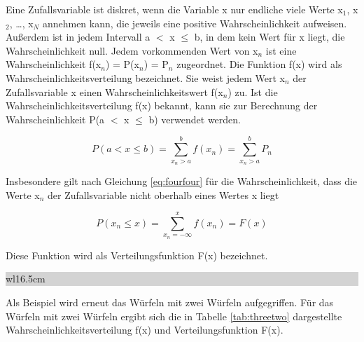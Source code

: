 \noindent Eine Zufallsvariable ist diskret, wenn die Variable x nur endliche viele Werte x$_{1}$, x$_{2}$, {\dots}, x$_{N}$ annehmen kann, die jeweils eine positive Wahrscheinlichkeit aufweisen. Au{\ss}erdem ist in jedem Intervall a $\mathrm{<}$ x $\leq$ b, in dem kein Wert f\"{u}r x liegt, die Wahrscheinlichkeit null. Jedem vorkommenden Wert von x$_{n}$ ist eine Wahrscheinlichkeit f(x$_{n}$) = P(x$_{n}$) = P$_{n}$ zugeordnet. Die Funktion f(x) wird als Wahrscheinlichkeitsverteilung bezeichnet. Sie weist jedem Wert x$_{n}$ der Zufallsvariable x einen Wahrscheinlichkeitswert f(x$_{n}$) zu. Ist die Wahrscheinlichkeitsverteilung f(x) bekannt, kann sie zur Berechnung der Wahrscheinlichkeit P(a $\mathrm{<}$ x $\leq$ b) verwendet werden.

\begin{equation}\label{eq:fourfour}
P(a<x\le b)=\sum _{x_{n} >a}^{b}f(x_{n}) =\sum _{x_{n} >a}^{b}P_{n}
\end{equation}

\noindent Insbesondere gilt nach Gleichung \eqref{eq:fourfour} f\"{u}r die Wahrscheinlichkeit, dass die Werte x$_{n}$ der Zufallsvariable nicht oberhalb eines Wertes x liegt

\begin{equation}\label{eq:fourfive}
P(x_{n} \le x)=\sum _{x_{n} =-\infty }^{x}f(x_{n}) =F(x)
\end{equation}

\noindent Diese Funktion wird als Verteilungsfunktion F(x) bezeichnet.

\noindent
\colorbox{lightgray}{%
%
\renewcommand\arraystretch{0.6}%
\begin{tabular}{ wl{16.5cm} }
{}
\end{tabular}%
}\medskip

\noindent Als Beispiel wird erneut das W\"{u}rfeln mit zwei W\"{u}rfeln aufgegriffen. F\"{u}r das W\"{u}rfeln mit zwei W\"{u}rfeln ergibt sich die in Tabelle \ref{tab:threetwo} dargestellte Wahrscheinlichkeitsverteilung f(x) und Verteilungsfunktion F(x). 

